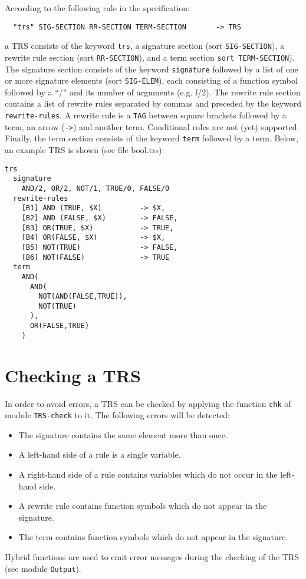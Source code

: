 According to the following rule in the specification:
\begin{verbatim}
  "trs" SIG-SECTION RR-SECTION TERM-SECTION       -> TRS
\end{verbatim}
a TRS consists of the keyword {\tt trs}, a signature section (sort
{\tt SIG-SECTION}), a rewrite rule section (sort {\tt RR-SECTION}), and a
term section {\tt sort TERM-SECTION}). The signature section consists of
the keyword {\tt signature} followed by a list of one or more signature
elements (sort {\tt SIG-ELEM}), each consisting of a function symbol
followed by a ``/'' and its number of arguments (e.g. f/2).
The rewrite rule section contains a list of rewrite rules separated by
commas and preceded by the keyword {\tt rewrite-rules}. A rewrite rule
is a {\tt TAG} between square brackets followed by a term, an arrow ({\tt ->})
and another term. Conditional rules are not (yet) supported. Finally, the
term section consists of the keyword {\tt term} followed by a term.
Below, an example TRS is shown (see file bool.trs):
\begin{verbatim}
trs
  signature
    AND/2, OR/2, NOT/1, TRUE/0, FALSE/0
  rewrite-rules
    [B1] AND (TRUE, $X)         -> $X,
    [B2] AND (FALSE, $X)        -> FALSE,
    [B3] OR(TRUE, $X)           -> TRUE,
    [B4] OR(FALSE, $X)          -> $X,
    [B5] NOT(TRUE)              -> FALSE,
    [B6] NOT(FALSE)             -> TRUE
  term
    AND(
      AND(
        NOT(AND(FALSE,TRUE)),
        NOT(TRUE)
      ),
      OR(FALSE,TRUE)
    )
\end{verbatim}

\section{Checking a TRS}

In order to avoid errors, a TRS can be checked by applying the function
{\tt chk} of module {\tt TRS-check} to it. The following errors will be
detected:
\begin{itemize}
  \item
    The signature contains the same element more than once.
  \item
    A left-hand side of a rule is a single variable.
  \item
    A right-hand side of a rule contains variables which do not occur
    in the left-hand side.
  \item
    A rewrite rule contains function symbols which do not appear in
    the signature.
  \item
    The term contains function symbols which do not appear in
    the signature.
\end{itemize}
Hybrid functions \cite{ASDFman92} are used to emit error messages during
the checking of the TRS (see module {\tt Output}).

